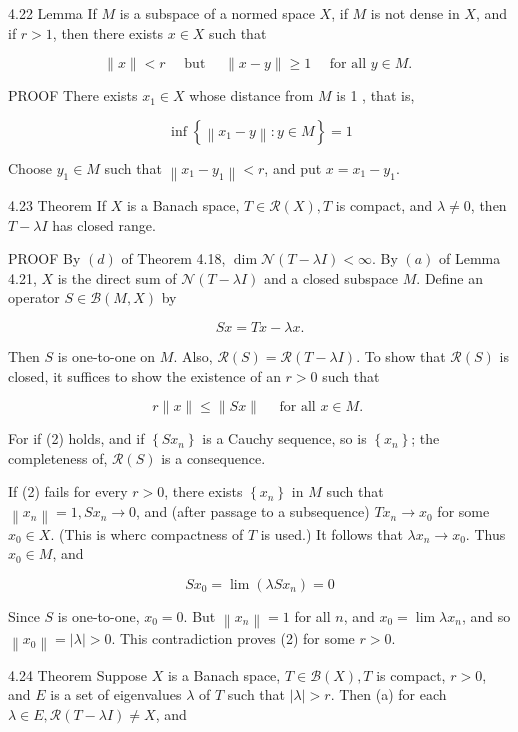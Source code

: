 \documentclass[10pt]{article}
\begin{document}
4.22 Lemma If $M$ is a subspace of a normed space $X$, if $M$ is not dense in $X$, and if $r>1$, then there exists $x \in X$ such that

$$
\|x\|<r \quad \text { but } \quad\|x-y\| \geq 1 \quad \text { for all } y \in M \text {. }
$$

PROOF There exists $x_{1} \in X$ whose distance from $M$ is 1 , that is,

$$
\inf \left\{\left\|x_{1}-y\right\|: y \in M\right\}=1
$$

Choose $y_{1} \in M$ such that $\left\|x_{1}-y_{1}\right\|<r$, and put $x=x_{1}-y_{1}$.

4.23 Theorem If $X$ is a Banach space, $T \in \mathscr{R}(X), T$ is compact, and $\lambda \neq 0$, then $T-\lambda I$ has closed range.

PROOF By $(d)$ of Theorem 4.18, $\operatorname{dim} \mathscr{N}(T-\lambda I)<\infty$. By $(a)$ of Lemma 4.21, $X$ is the direct sum of $\mathscr{N}(T-\lambda I)$ and a closed subspace $M$. Define an operator $S \in \mathscr{B}(M, X)$ by

$$
S x=T x-\lambda x .
$$

Then $S$ is one-to-one on $M$. Also, $\mathscr{R}(S)=\mathscr{R}(T-\lambda I)$. To show that $\mathscr{R}(S)$ is closed, it suffices to show the existence of an $r>0$ such that

$$
r\|x\| \leq\|S x\| \quad \text { for all } x \in M \text {. }
$$

For if (2) holds, and if $\left\{S x_{n}\right\}$ is a Cauchy sequence, so is $\left\{x_{n}\right\}$; the completeness of, $\mathscr{R}(S)$ is a consequence.

If (2) fails for every $r>0$, there exists $\left\{x_{n}\right\}$ in $M$ such that $\left\|x_{n}\right\|=1, S x_{n} \rightarrow 0$, and (after passage to a subsequence) $T x_{n} \rightarrow x_{0}$ for some $x_{0} \in X$. (This is wherc compactness of $T$ is used.) It follows that $\lambda x_{n} \rightarrow x_{0}$. Thus $x_{0} \in M$, and

$$
S x_{0}=\lim \left(\lambda S x_{n}\right)=0
$$

Since $S$ is one-to-one, $x_{0}=0$. But $\left\|x_{n}\right\|=1$ for all $n$, and $x_{0}=\lim \lambda x_{n}$, and so $\left\|x_{0}\right\|=|\lambda|>0$. This contradiction proves (2) for some $r>0$.

4.24 Theorem Suppose $X$ is a Banach space, $T \in \mathscr{B}(X), T$ is compact, $r>0$, and $E$ is a set of eigenvalues $\lambda$ of $T$ such that $|\lambda|>r$. Then
(a) for each $\lambda \in E, \mathscr{R}(T-\lambda I) \neq X$, and
\end{document}
